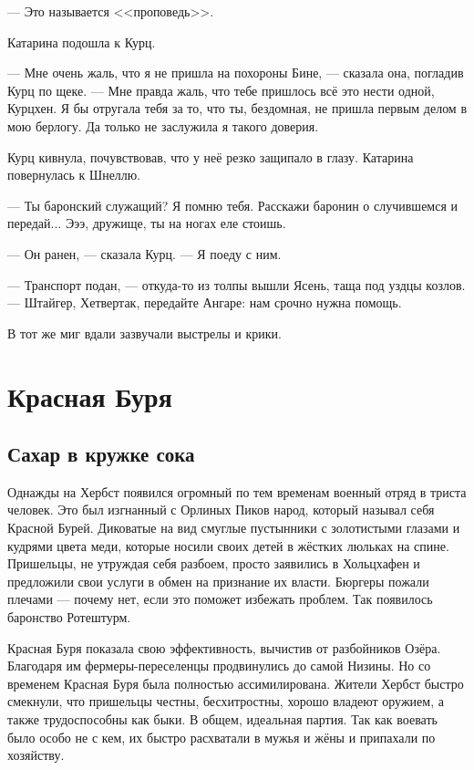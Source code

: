 --- Это называется <<проповедь>>.

Катарина подошла к Курц.

--- Мне очень жаль, что я не пришла на похороны Бине, --- сказала она, погладив Курц по щеке.
--- Мне правда жаль, что тебе пришлось всё это нести одной, Курцхен.
Я бы отругала тебя за то, что ты, бездомная, не пришла первым делом в мою берлогу.
Да только не заслужила я такого доверия.

Курц кивнула, почувствовав, что у неё резко защипало в глазу.
Катарина повернулась к Шнеллю.

--- Ты баронский служащий?
Я помню тебя.
Расскажи баронин о случившемся и передай...
Эээ, дружище, ты на ногах еле стоишь.

--- Он ранен, --- сказала Курц.
--- Я поеду с ним.

--- Транспорт подан, --- откуда-то из толпы вышли Ясень, таща под уздцы козлов.
--- Штайгер, Хетвертак, передайте Ангаре: нам срочно нужна помощь.

В тот же миг вдали зазвучали выстрелы и крики.

\chapter{Красная Буря}

\section{Сахар в кружке сока}

Однажды на Хербст появился огромный по тем временам военный отряд в триста человек.
Это был изгнанный с Орлиных Пиков народ, который называл себя Красной Бурей.
Диковатые на вид смуглые пустынники с золотистыми глазами и кудрями цвета меди, которые носили своих детей в жёстких люльках на спине.
Пришельцы, не утруждая себя разбоем, просто заявились в Хольцхафен и предложили свои услуги в обмен на признание их власти.
Бюргеры пожали плечами --- почему нет, если это поможет избежать проблем.
Так появилось баронство Ротештурм.

Красная Буря показала свою эффективность, вычистив от разбойников Озёра.
Благодаря им фермеры-переселенцы продвинулись до самой Низины.
Но со временем Красная Буря была полностью ассимилирована.
Жители Хербст быстро смекнули, что пришельцы честны, бесхитростны, хорошо владеют оружием, а также трудоспособны как быки.
В общем, идеальная партия.
Так как воевать было особо не с кем, их быстро расхватали в мужья и жёны и припахали по хозяйству.

